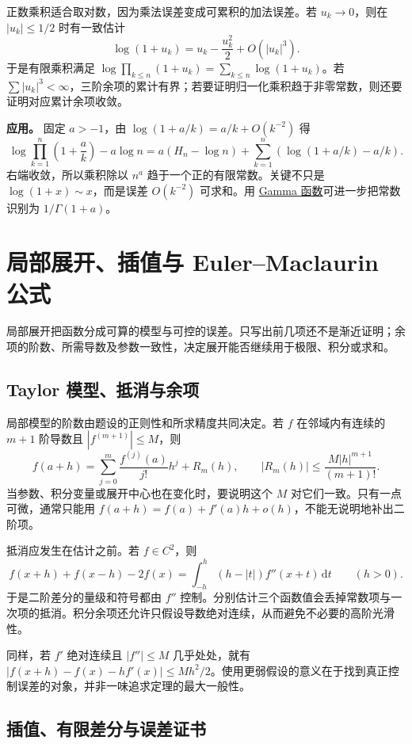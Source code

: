 \documentclass[UTF8,12pt,a4paper,fontset=fandol]{ctexart}
\begin{document}
\label{app:limit-products}

正数乘积适合取对数，因为乘法误差变成可累积的加法误差。若 $u_k\to0$，则在 $|u_k|\leq1/2$ 时有一致估计
\[
\log(1+u_k)=u_k-\frac{u_k^2}{2}+O(|u_k|^3).
\]
于是有限乘积满足 $\log\prod_{k\leq n}(1+u_k)=\sum_{k\leq n}\log(1+u_k)$。若 $\sum|u_k|^3<\infty$，三阶余项的累计有界；若要证明归一化乘积趋于非零常数，则还要证明对应累计余项收敛。

\textbf{应用。} 固定 $a>-1$，由 $\log(1+a/k)=a/k+O(k^{-2})$ 得
\[
\log\prod_{k=1}^n\left(1+\frac ak\right)-a\log n
=a(H_n-\log n)+\sum_{k=1}^n\left(\log(1+a/k)-a/k\right).
\]
右端收敛，所以乘积除以 $n^a$ 趋于一个正的有限常数。关键不只是 $\log(1+x)\sim x$，而是误差 $O(k^{-2})$ 可求和。用 \hyperref[app:special-gamma]{Gamma 函数}可进一步把常数识别为 $1/\Gamma(1+a)$。



\section{局部展开、插值与 Euler–Maclaurin 公式}

局部展开把函数分成可算的模型与可控的误差。只写出前几项还不是渐近证明；余项的阶数、所需导数及参数一致性，决定展开能否继续用于极限、积分或求和。

\subsection{Taylor 模型、抵消与余项}

\label{app:estimate-taylor}

局部模型的阶数由题设的正则性和所求精度共同决定。若 $f$ 在邻域内有连续的 $m+1$ 阶导数且 $|f^{(m+1)}|\leq M$，则
\[
f(a+h)=\sum_{j=0}^m\frac{f^{(j)}(a)}{j!}h^j+R_m(h),
\qquad |R_m(h)|\leq\frac{M|h|^{m+1}}{(m+1)!}.
\]
当参数、积分变量或展开中心也在变化时，要说明这个 $M$ 对它们一致。只有一点可微，通常只能用 $f(a+h)=f(a)+f'(a)h+o(h)$，不能无说明地补出二阶项。

抵消应发生在估计之前。若 $f\in C^2$，则
\[
f(x+h)+f(x-h)-2f(x)
=\int_{-h}^{h}(h-|t|)f''(x+t)\,\mathrm dt\qquad(h>0).
\]
于是二阶差分的量级和符号都由 $f''$ 控制。分别估计三个函数值会丢掉常数项与一次项的抵消。积分余项还允许只假设导数绝对连续，从而避免不必要的高阶光滑性。

同样，若 $f'$ 绝对连续且 $|f''|\leq M$ 几乎处处，就有 $|f(x+h)-f(x)-hf'(x)|\leq Mh^2/2$。使用更弱假设的意义在于找到真正控制误差的对象，并非一味追求定理的最大一般性。

\subsection{插值、有限差分与误差证书}
\end{document}
